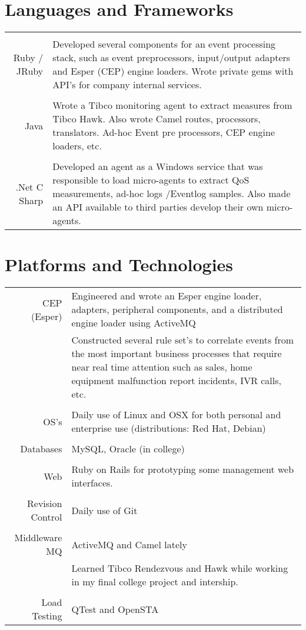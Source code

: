 \documentclass[a4paper,10pt]{article}
\begin{document}
\section{Languages and Frameworks}
\begin{tabular}{r|p{11cm}}
\multicolumn{2}{c}{} \\
	Ruby / JRuby
	& Developed several components for an event processing stack, such as event preprocessors, input/output adapters and Esper (CEP) engine loaders. 
	Wrote private gems with API's for company internal services.\\
\multicolumn{2}{c}{} \\
	Java
	&  Wrote a Tibco monitoring agent to extract measures from Tibco Hawk. Also wrote Camel routes, processors, translators. Ad-hoc Event pre processors, CEP engine loaders, etc.\\
\multicolumn{2}{c}{} \\
	.Net C Sharp
	&  Developed an agent as a Windows service that was responsible to load micro-agents to extract QoS measurements, ad-hoc logs /Eventlog samples. 
	Also made an API available to third parties develop their own micro-agents.\\
\end{tabular}

\section{Platforms and Technologies}
\begin{tabular}{r|p{11cm}}
	CEP (Esper) 
	& Engineered and wrote an Esper engine loader, adapters, peripheral components, and a distributed engine loader using ActiveMQ\\
	& Constructed several rule set's to correlate events from the most important business processes that require near real time attention such as sales, home equipment malfunction report incidents,
	    IVR calls, etc.\\
\multicolumn{2}{c}{} \\ 
	OS's 
	&  Daily use of Linux and OSX for both personal and enterprise use (distributions: Red Hat, Debian) \\
\multicolumn{2}{c}{} \\
	Databases 
	& MySQL, Oracle (in college)\\
\multicolumn{2}{c}{} \\
	Web 
	& Ruby on Rails for prototyping some management web interfaces.\\
\multicolumn{2}{c}{} \\
	Revision Control 
	& Daily use of Git\\
\multicolumn{2}{c}{} \\
	Middleware \ MQ 
	& ActiveMQ and Camel lately\\
	& Learned Tibco Rendezvous and Hawk while working in my final college project and intership. \\
\multicolumn{2}{c}{} \\
	Load Testing 
	& QTest and OpenSTA
\end{tabular}
\end{document}
